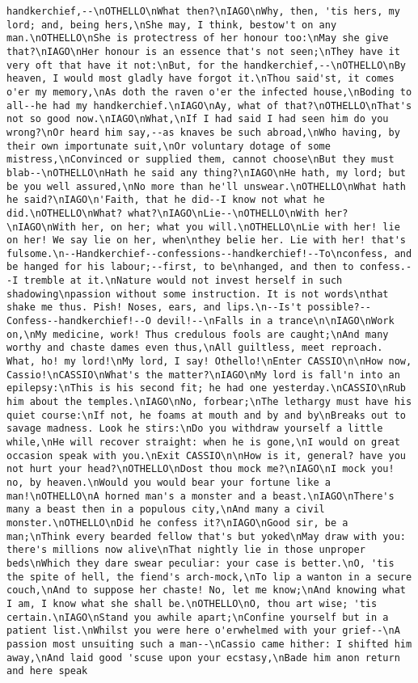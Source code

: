 \begin{verbatim}
handkerchief,--\nOTHELLO\nWhat then?\nIAGO\nWhy, then, 'tis hers, my lord; and, being hers,\nShe may, I think, bestow't on any man.\nOTHELLO\nShe is protectress of her honour too:\nMay she give that?\nIAGO\nHer honour is an essence that's not seen;\nThey have it very oft that have it not:\nBut, for the handkerchief,--\nOTHELLO\nBy heaven, I would most gladly have forgot it.\nThou said'st, it comes o'er my memory,\nAs doth the raven o'er the infected house,\nBoding to all--he had my handkerchief.\nIAGO\nAy, what of that?\nOTHELLO\nThat's not so good now.\nIAGO\nWhat,\nIf I had said I had seen him do you wrong?\nOr heard him say,--as knaves be such abroad,\nWho having, by their own importunate suit,\nOr voluntary dotage of some mistress,\nConvinced or supplied them, cannot choose\nBut they must blab--\nOTHELLO\nHath he said any thing?\nIAGO\nHe hath, my lord; but be you well assured,\nNo more than he'll unswear.\nOTHELLO\nWhat hath he said?\nIAGO\n'Faith, that he did--I know not what he did.\nOTHELLO\nWhat? what?\nIAGO\nLie--\nOTHELLO\nWith her?\nIAGO\nWith her, on her; what you will.\nOTHELLO\nLie with her! lie on her! We say lie on her, when\nthey belie her. Lie with her! that's fulsome.\n--Handkerchief--confessions--handkerchief!--To\nconfess, and be hanged for his labour;--first, to be\nhanged, and then to confess.--I tremble at it.\nNature would not invest herself in such shadowing\npassion without some instruction. It is not words\nthat shake me thus. Pish! Noses, ears, and lips.\n--Is't possible?--Confess--handkerchief!--O devil!--\nFalls in a trance\n\nIAGO\nWork on,\nMy medicine, work! Thus credulous fools are caught;\nAnd many worthy and chaste dames even thus,\nAll guiltless, meet reproach. What, ho! my lord!\nMy lord, I say! Othello!\nEnter CASSIO\n\nHow now, Cassio!\nCASSIO\nWhat's the matter?\nIAGO\nMy lord is fall'n into an epilepsy:\nThis is his second fit; he had one yesterday.\nCASSIO\nRub him about the temples.\nIAGO\nNo, forbear;\nThe lethargy must have his quiet course:\nIf not, he foams at mouth and by and by\nBreaks out to savage madness. Look he stirs:\nDo you withdraw yourself a little while,\nHe will recover straight: when he is gone,\nI would on great occasion speak with you.\nExit CASSIO\n\nHow is it, general? have you not hurt your head?\nOTHELLO\nDost thou mock me?\nIAGO\nI mock you! no, by heaven.\nWould you would bear your fortune like a man!\nOTHELLO\nA horned man's a monster and a beast.\nIAGO\nThere's many a beast then in a populous city,\nAnd many a civil monster.\nOTHELLO\nDid he confess it?\nIAGO\nGood sir, be a man;\nThink every bearded fellow that's but yoked\nMay draw with you: there's millions now alive\nThat nightly lie in those unproper beds\nWhich they dare swear peculiar: your case is better.\nO, 'tis the spite of hell, the fiend's arch-mock,\nTo lip a wanton in a secure couch,\nAnd to suppose her chaste! No, let me know;\nAnd knowing what I am, I know what she shall be.\nOTHELLO\nO, thou art wise; 'tis certain.\nIAGO\nStand you awhile apart;\nConfine yourself but in a patient list.\nWhilst you were here o'erwhelmed with your grief--\nA passion most unsuiting such a man--\nCassio came hither: I shifted him away,\nAnd laid good 'scuse upon your ecstasy,\nBade him anon return and here speak 
\end{verbatim}

